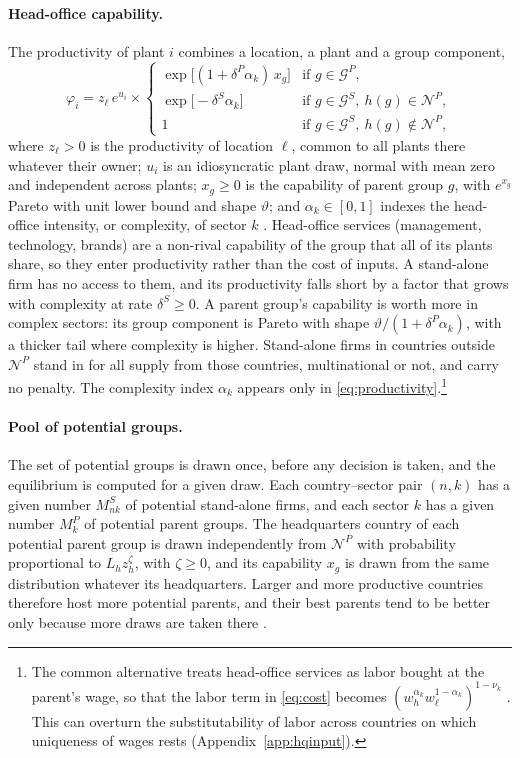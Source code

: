 \documentclass[11pt]{article}
\theoremstyle{definition}
\theoremstyle{remark}
\newcommand{\cN}{\mathcal N}
\newcommand{\cG}{\mathcal G}
\begin{document}
\paragraph{Head-office capability.} The productivity of plant $i$ combines a location,
a plant and a group component,
\begin{equation}
  \varphi_i=z_\ell\,e^{u_i}\times
  \begin{cases}
    \exp\bigl[(1+\delta^P\alpha_k)\,x_g\bigr] & \text{if } g\in\cG^P,\\[2pt]
    \exp\bigl[-\delta^S\alpha_k\bigr] & \text{if } g\in\cG^S,\ h(g)\in\cN^P,\\[2pt]
    1 & \text{if } g\in\cG^S,\ h(g)\notin\cN^P,
  \end{cases}
  \label{eq:productivity}
\end{equation}
where $z_\ell>0$ is the productivity of location $\ell$, common to all plants there
whatever their owner; $u_i$ is an idiosyncratic plant draw, normal with mean zero and
independent across plants; $x_g\ge0$ is the capability of parent group $g$, with
$e^{x_g}$ Pareto with unit lower bound and shape $\vartheta$; and $\alpha_k\in[0,1]$
indexes the head-office intensity, or complexity, of sector $k$
\citep{Antras2003,AntrasHelpman2004}. Head-office services (management, technology,
brands) are a non-rival capability of the group that all of its plants share, so they
enter productivity rather than the cost of inputs. A stand-alone firm has no access to
them, and its productivity falls short by a factor that grows with complexity at rate
$\delta^S\ge0$. A parent group's capability is worth more in complex sectors: its
group component is Pareto with shape $\vartheta/(1+\delta^P\alpha_k)$, with a thicker
tail where complexity is higher. Stand-alone firms in countries outside $\cN^P$ stand in for
all supply from those countries, multinational or not, and carry no penalty. The
complexity index $\alpha_k$ appears only in \eqref{eq:productivity}.\footnote{The
common alternative treats head-office services as labor bought at the parent's wage,
so that the labor term in \eqref{eq:cost} becomes
$(w_{h}^{\alpha_k}w_\ell^{1-\alpha_k})^{1-\nu_k}$ \citep{Antras2003}. This can overturn
the substitutability of labor across countries on which uniqueness of wages rests
(Appendix~\ref{app:hqinput}).}

\paragraph{Pool of potential groups.} The set of potential groups is drawn once,
before any decision is taken, and the equilibrium is computed for a given draw. Each
country--sector pair $(n,k)$ has a given number $M^S_{nk}$ of potential stand-alone
firms, and each sector $k$ has a given number $M^P_k$ of potential parent groups. The
headquarters country of each potential parent group is drawn independently from
$\cN^P$ with probability proportional to $L_hz_h^{\zeta}$, with $\zeta\ge0$, and its
capability $x_g$ is drawn from the same distribution whatever its headquarters. Larger
and more productive countries therefore host more potential parents, and their best
parents tend to be better only because more draws are taken there
\citep{GaubertItskhoki2021}.
\end{document}

